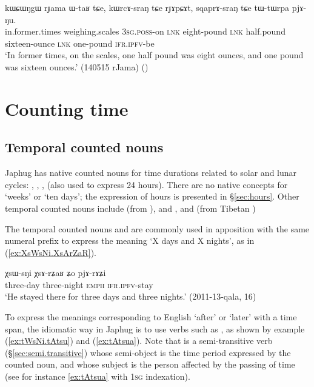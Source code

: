 \begin{exe}
\ex \label{ex:sqaprAsrang}
\gll kɯɕɯŋgɯ rɟama ɯ-taʁ tɕe, kɯrcɤ-sraŋ tɕe rɟɤpɕɤt,  sqaprɤ-sraŋ tɕe tɯ-tɯrpa pjɤ-ŋu. \\
in.former.times weighing.scales \textsc{3sg}.\textsc{poss}-on \textsc{lnk} eight-pound \textsc{lnk} half.pound sixteen-ounce \textsc{lnk} one-pound \textsc{ifr}.\textsc{ipfv}-be \\
\glt  `In former times, on the scales, one half pound was eight ounces, and one pound was sixteen ounces.' (140515 rJama)
()
\end{exe}
 

\section{Counting time} \label{sec:time}
\subsection{Temporal counted nouns} \label{sec:CN.time}
Japhug has native counted nouns for time durations related to solar and lunar cycles: , , ,  (also used to express 24 hours). There are no native concepts for `weeks' or `ten days'; the expression of hours is presented in §\ref{sec:hours}. Other temporal counted nouns include  (from ),  and , and  (from Tibetan )


The temporal counted nouns   and  are commonly used in apposition with the same numeral prefix to express the meaning `X days and X nights', as in (\ref{ex:XsWsNi.XsArZaR}).

\begin{exe}
\ex \label{ex:XsWsNi.XsArZaR}
\gll χsɯ-sŋi χsɤ-rʑaʁ ʑo pjɤ-rɤʑi \\
three-day three-night \textsc{emph} \textsc{ifr}.\textsc{ipfv}-stay \\
\glt `He stayed there for three days and three nights.' (2011-13-qala, 16)
\end{exe}  

To express the meanings corresponding to English `after' or `later' with a time span, the idiomatic way in Japhug is to use verbs such as , as shown by example (\ref{ex:tWsNi.tAtsu}) and (\ref{ex:tAtsua}). Note that  is a semi-transitive verb (§\ref{sec:semi.transitive}) whose semi-object is the time period expressed by the counted noun, and whose subject is the person affected by the passing of time (see for instance \ref{ex:tAtsua} with \textsc{1sg} indexation).

